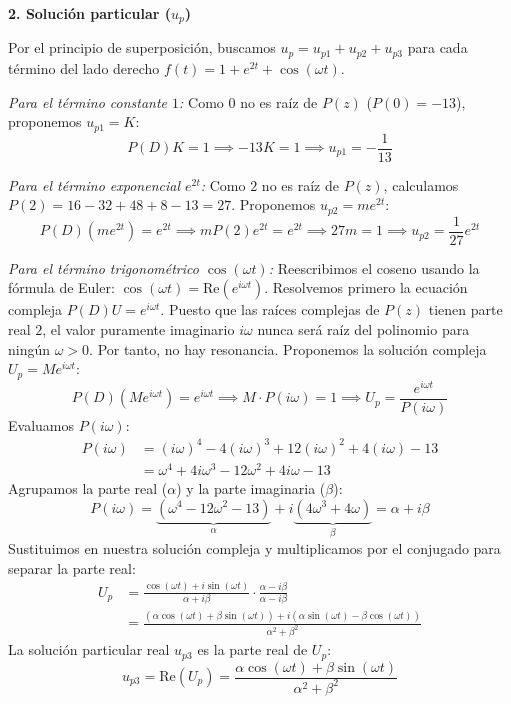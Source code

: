 {\begin{enumerate}
        \textbf{2. Solución particular ($u_p$)}

        Por el principio de superposición, buscamos $u_p = u_{p1} + u_{p2} + u_{p3}$ para cada término del lado derecho $f(t) = 1 + e^{2t} + \cos(\omega t)$.

        \textit{Para el término constante $1$:}
        Como $0$ no es raíz de $P(z)$ ($P(0) = -13$), proponemos $u_{p1} = K$:
        \[
            P(D)K = 1 \implies -13K = 1 \implies u_{p1} = -\frac{1}{13}
        \]

        \textit{Para el término exponencial $e^{2t}$:}
        Como $2$ no es raíz de $P(z)$, calculamos $P(2) = 16 - 32 + 48 + 8 - 13 = 27$. Proponemos $u_{p2} = m e^{2t}$:
        \[
            P(D)(m e^{2t}) = e^{2t} \implies m P(2) e^{2t} = e^{2t} \implies 27m = 1 \implies u_{p2} = \frac{1}{27}e^{2t}
        \]

        \textit{Para el término trigonométrico $\cos(\omega t)$:}
        Reescribimos el coseno usando la fórmula de Euler: $\cos(\omega t) = \text{Re}(e^{i\omega t})$. 
        Resolvemos primero la ecuación compleja $P(D)U = e^{i\omega t}$. Puesto que las raíces complejas de $P(z)$ tienen parte real $2$, el valor puramente imaginario $i\omega$ nunca será raíz del polinomio para ningún $\omega > 0$. Por tanto, no hay resonancia.
        Proponemos la solución compleja $U_p = M e^{i\omega t}$:
        \[
            P(D)(M e^{i\omega t}) = e^{i\omega t} \implies M \cdot P(i\omega) = 1 \implies U_p = \frac{e^{i\omega t}}{P(i\omega)}
        \]
        Evaluamos $P(i\omega)$:
        \begin{align*}
            P(i\omega) &= (i\omega)^4 - 4(i\omega)^3 + 12(i\omega)^2 + 4(i\omega) - 13 \\
            &= \omega^4 + 4i\omega^3 - 12\omega^2 + 4i\omega - 13
        \end{align*}
        Agrupamos la parte real ($\alpha$) y la parte imaginaria ($\beta$):
        \[
            P(i\omega) = \underbrace{(\omega^4 - 12\omega^2 - 13)}_{\alpha} + i \underbrace{(4\omega^3 + 4\omega)}_{\beta} = \alpha + i\beta
        \]
        Sustituimos en nuestra solución compleja y multiplicamos por el conjugado para separar la parte real:
        \begin{align*}
            U_p &= \frac{\cos(\omega t) + i\sin(\omega t)}{\alpha + i\beta} \cdot \frac{\alpha - i\beta}{\alpha - i\beta} \\
            &= \frac{(\alpha \cos(\omega t) + \beta \sin(\omega t)) + i(\alpha \sin(\omega t) - \beta \cos(\omega t))}{\alpha^2 + \beta^2}
        \end{align*}
        La solución particular real $u_{p3}$ es la parte real de $U_p$:
        \[
            u_{p3} = \text{Re}(U_p) = \frac{\alpha \cos(\omega t) + \beta \sin(\omega t)}{\alpha^2 + \beta^2}
        \]


\end{enumerate}}
